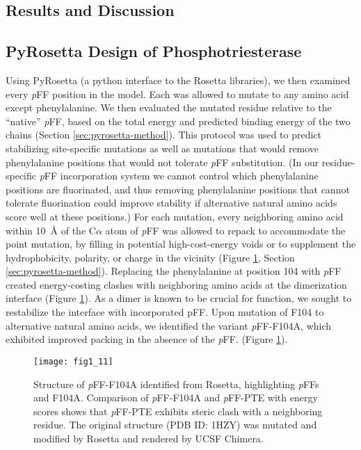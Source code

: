 \begin{refsection}
\section{Results and Discussion}

\subsection{PyRosetta Design of Phosphotriesterase}

Using PyRosetta (a python interface to the Rosetta
libraries)\cite{Leaver-Fay2011}, we then examined every \emph{p}FF position in
the model. Each was allowed to mutate to any amino acid except phenylalanine.
We then evaluated the mutated residue relative to the “native” \emph{p}FF,
based on the total energy and predicted binding energy of the two chains
(Section \ref{sec:pyrosetta-method}). This protocol was used to predict
stabilizing site-specific mutations as well as mutations that would remove
phenylalanine positions that would not tolerate \emph{p}FF substitution. (In
our residue-specific \emph{p}FF incorporation system we cannot control which
phenylalanine positions are fluorinated, and thus removing phenylalanine
positions that cannot tolerate fluorination could improve stability if
alternative natural amino acids score well at these positions.) For each
mutation, every neighboring amino acid within \SI{10}{\AA} of the C$\alpha$
atom of \emph{p}FF was allowed to repack to accommodate the point mutation, by
filling in potential high-cost-energy voids or to supplement the
hydrophobicity, polarity, or charge in the vicinity (Figure
\ref{fig:rosetta-pte}, Section \ref{sec:pyrosetta-method}).  Replacing the
phenylalanine at position 104 with \emph{p}FF created energy-costing clashes
with neighboring amino acids at the dimerization interface (Figure
\ref{fig:rosetta-pte}). As a dimer is known to be crucial for
function\cite{Baker2011b}, we sought to restabilize the interface with
incorporated pFF. Upon mutation of F104 to alternative natural amino acids, we
identified the variant \emph{p}FF-F104A, which exhibited improved packing in
the absence of the \emph{p}FF. (Figure \ref{fig:rosetta-pte}).

\begin{figure}[h!] \centering \texttt{[image: fig1\_11]}
    \caption[Structure of \emph{p}FF-F104A identified from Rosetta,
        highlighting \emph{p}FFs and F104A. Comparison of \emph{p}FF-F104A and
        \emph{p}FF-PTE with energy scores shows that \emph{p}FF-PTE exhibits
        steric clash with a neighboring residue.  The original structure (PDB
        ID: 1HZY) was mutated and modified by Rosetta and rendered by UCSF
    Chimera.]{Structure of \emph{p}FF-F104A identified from Rosetta,
    highlighting \emph{p}FFs and F104A. Comparison of \emph{p}FF-F104A and
    \emph{p}FF-PTE with energy scores shows that \emph{p}FF-PTE exhibits steric
    clash with a neighboring residue. The original structure (PDB ID: 1HZY) was
    mutated and modified by Rosetta and rendered by UCSF Chimera.}
    \label{fig:rosetta-pte}
\end{figure}


\end{refsection}
